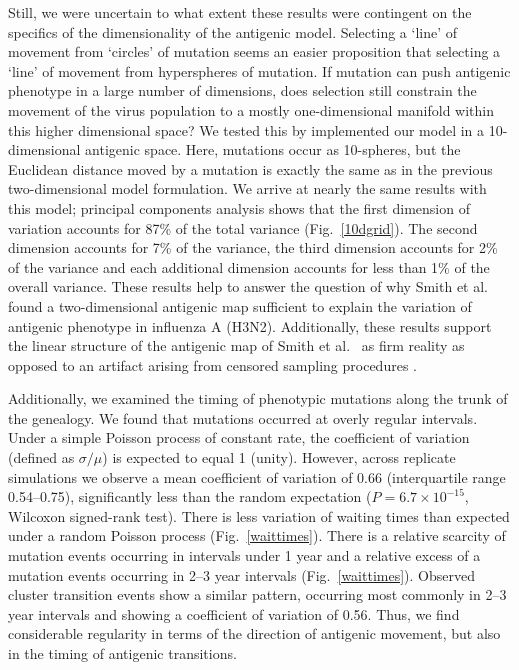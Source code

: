 \documentclass[11pt,oneside,letterpaper]{article}
\begin{document}
Still, we were uncertain to what extent these results were contingent on the specifics of the dimensionality of the antigenic model.  Selecting a `line' of movement from `circles' of mutation seems an easier proposition that selecting a `line' of movement from hyperspheres of mutation.  If mutation can push antigenic phenotype in a large number of dimensions, does selection still constrain the movement of the virus population to a mostly one-dimensional manifold within this higher dimensional space?  We tested this by implemented our model in a 10-dimensional antigenic space.  Here, mutations occur as 10-spheres, but the Euclidean distance moved by a mutation is exactly the same as in the previous two-dimensional model formulation.  We arrive at nearly the same results with this model; principal components analysis shows that the first dimension of variation accounts for 87\% of the total variance (Fig.~\ref{10dgrid}).  The second dimension accounts for 7\% of the variance, the third dimension accounts for 2\% of the variance and each additional dimension accounts for less than 1\% of the overall variance.  These results help to answer the question of why Smith et al.\ \cite{Smith04} found a two-dimensional antigenic map sufficient to explain the variation of antigenic phenotype in influenza A (H3N2).  Additionally, these results support the linear structure of the antigenic map of Smith et al.\ \cite{Smith04} as firm reality as opposed to an artifact arising from censored sampling procedures \cite{Recker07}.

Additionally, we examined the timing of phenotypic mutations along the trunk of the genealogy.  We found that mutations occurred at overly regular intervals.  Under a simple Poisson process of constant rate, the coefficient of variation (defined as $\sigma / \mu$) is expected to equal 1 (unity).  However, across replicate simulations we observe a mean coefficient of variation of 0.66  (interquartile range 0.54--0.75), significantly less than the random expectation ($P = 6.7 \times 10^{-15}$, Wilcoxon signed-rank test).  There is less variation of waiting times than expected under a random Poisson process (Fig.~\ref{waittimes}).  There is a relative scarcity of mutation events occurring in intervals under 1 year and a relative excess of a mutation events occurring in 2--3 year intervals (Fig.~\ref{waittimes}).  Observed cluster transition events show a similar pattern, occurring most commonly in 2--3 year intervals and showing a coefficient of variation of 0.56.  Thus, we find considerable regularity in terms of the direction of antigenic movement, but also in the timing of antigenic transitions.  
\end{document}
